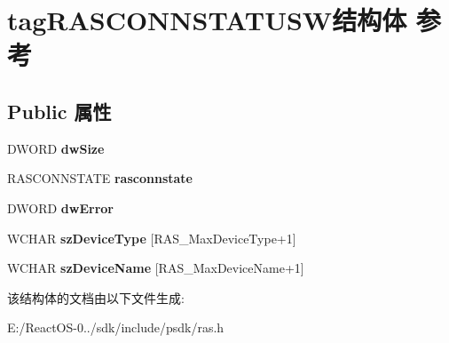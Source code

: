 \hypertarget{structtag_r_a_s_c_o_n_n_s_t_a_t_u_s_w}{}\section{tag\+R\+A\+S\+C\+O\+N\+N\+S\+T\+A\+T\+U\+S\+W结构体 参考}
\label{structtag_r_a_s_c_o_n_n_s_t_a_t_u_s_w}
\subsection*{Public 属性}
\begin{DoxyCompactItemize}
\item 
\mbox{\label{structtag_r_a_s_c_o_n_n_s_t_a_t_u_s_w_a053787d79438d59b6a1669b7b1aa45ae}} 
D\+W\+O\+RD {\bfseries dw\+Size}
\item 
\mbox{\label{structtag_r_a_s_c_o_n_n_s_t_a_t_u_s_w_a1d8ae3dadd40fb68595c83f37fbe6c78}} 
R\+A\+S\+C\+O\+N\+N\+S\+T\+A\+TE {\bfseries rasconnstate}
\item 
\mbox{\label{structtag_r_a_s_c_o_n_n_s_t_a_t_u_s_w_a0fda3a560c61760c7d32b4cf6612be7d}} 
D\+W\+O\+RD {\bfseries dw\+Error}
\item 
\mbox{\label{structtag_r_a_s_c_o_n_n_s_t_a_t_u_s_w_aa540158a2e8c3e677048442edaada7ec}} 
W\+C\+H\+AR {\bfseries sz\+Device\+Type} \mbox{[}R\+A\+S\+\_\+\+Max\+Device\+Type+1\mbox{]}
\item 
\mbox{\label{structtag_r_a_s_c_o_n_n_s_t_a_t_u_s_w_aeab919889f3fff3501725b1536cc4e8b}} 
W\+C\+H\+AR {\bfseries sz\+Device\+Name} \mbox{[}R\+A\+S\+\_\+\+Max\+Device\+Name+1\mbox{]}
\end{DoxyCompactItemize}


该结构体的文档由以下文件生成\+:\begin{DoxyCompactItemize}
\item 
E\+:/\+React\+O\+S-\/0../sdk/include/psdk/ras.\+h\end{DoxyCompactItemize}
